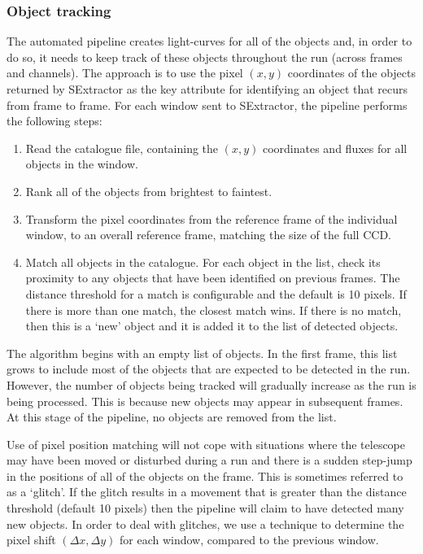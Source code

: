 \subsubsection{Object tracking}
The automated pipeline creates light-curves for all of the objects and, in order to do so, it needs to keep track of these objects throughout the run (across frames and channels). The approach is to use the pixel $(x, y)$ coordinates of the objects returned by SExtractor as the key attribute for identifying an object that recurs from frame to frame. For each window sent to SExtractor, the pipeline performs the following steps:
\begin{enumerate}
  \item{Read} the catalogue file, containing the $(x, y)$ coordinates and fluxes for all objects in the window.
  \item{Rank} all of the objects from brightest to faintest.
  \item{Transform} the pixel coordinates from the reference frame of the individual window, to an overall reference frame, matching the size of the full CCD. 
  \item{Match} all objects in the catalogue. For each object in the list, check its proximity to any objects that have been identified on previous frames. The distance threshold for a match is configurable and the default is 10 pixels. If there is more than one match, the closest match wins. If there is no match, then this is a `new' object and it is added it to the list of detected objects.  
\end{enumerate}

The algorithm begins with an empty list of objects. In the first frame, this list grows to include most of the objects that are expected to be detected in the run. However, the number of objects being tracked will gradually increase as the run is being processed. This is because new objects may appear in subsequent frames. At this stage of the pipeline, no objects are removed from the list. 

Use of pixel position matching will not cope with situations where the telescope may have been moved or disturbed during a run and there is a sudden step-jump in the positions of all of the objects on the frame. This is sometimes referred to as a `glitch'. If the glitch results in a movement that is greater than the distance threshold (default 10 pixels) then the pipeline will claim to have detected many new objects. In order to deal with glitches, we use a technique to determine the pixel shift $(\Delta x, \Delta y)$ for each window, compared to the previous window. 

